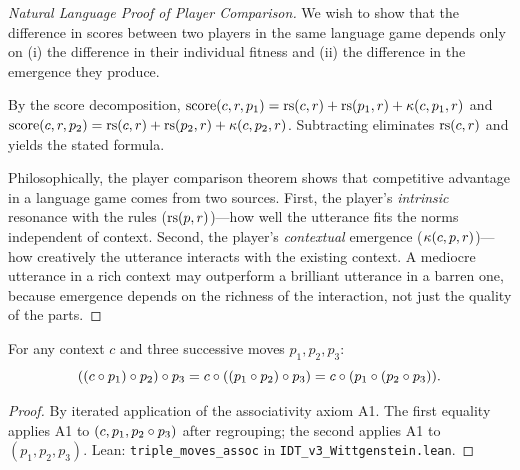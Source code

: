 \begin{proof}[Natural Language Proof of Player Comparison]
We wish to show that the difference in scores between two players in the same
language game depends only on (i) the difference in their individual fitness
and (ii) the difference in the emergence they produce.

By the score decomposition, $\mathrm{score}(c,r,p_1) = \mathrm{rs}(c,r) + \mathrm{rs}(p_1,r)
+ \kappa(c,p_1,r)$ and $\mathrm{score}(c,r,p_2) = \mathrm{rs}(c,r) + \mathrm{rs}(p_2,r)
+ \kappa(c,p_2,r)$. Subtracting eliminates $\mathrm{rs}(c,r)$ and yields the stated
formula.

Philosophically, the player comparison theorem shows that competitive advantage
in a language game comes from two sources. First, the player's \emph{intrinsic}
resonance with the rules ($\mathrm{rs}(p,r)$)---how well the utterance fits the norms
independent of context. Second, the player's \emph{contextual} emergence
($\kappa(c,p,r)$)---how creatively the utterance interacts with the existing
context. A mediocre utterance in a rich context may outperform a brilliant
utterance in a barren one, because emergence depends on the richness of
the interaction, not just the quality of the parts.
\end{proof}

\begin{theorem}
\label{thm:triple-moves}
For any context $c$ and three successive moves $p_1, p_2, p_3$:
\[
((c \circ p_1) \circ p_2) \circ p_3
= c \circ ((p_1 \circ p_2) \circ p_3)
= c \circ (p_1 \circ (p_2 \circ p_3)).
\]
\end{theorem}

\begin{proof}
By iterated application of the associativity axiom A1. The first equality
applies A1 to $(c, p_1, p_2 \circ p_3)$ after regrouping; the second
applies A1 to $(p_1, p_2, p_3)$.
Lean: \texttt{triple\_moves\_assoc} in \texttt{IDT\_v3\_Wittgenstein.lean}.
\end{proof}

